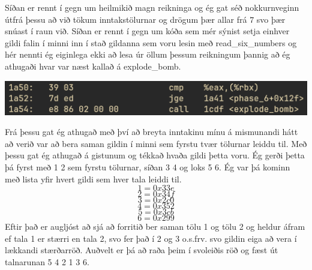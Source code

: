 \documentclass{article}
\begin{document}
	Síðan er rennt í gegn um heilmikið magn reikninga og ég gat séð 
	nokkurnveginn útfrá þessu að við tökum inntakstölurnar og drögum þær 
	allar frá $7$ svo þær snúast í raun við. Síðan er rennt í gegn um kóða sem mér sýnist 
	setja einhver gildi falin í minni inn í stað gildanna sem voru lesin með 
	read\_six\_numbers og hér nennti ég eiginlega ekki að lesa úr öllum þessum 
	reikningum þannig að ég athugaði hvar var næst kallað á explode\_bomb. 
	\begin{center}
		\includegraphics[scale=0.35]{cmp.png}
	\end{center}
	Frá þessu gat ég athugað með því að breyta inntakinu mínu á mismunandi hátt 
	að verið var að bera saman gildin í minni sem fyrstu tvær tölurnar leiddu til. 
	Með þessu gat ég athugað á gistunum og tékkað hvaða gildi þetta voru. Ég gerði 
	þetta þá fyrst með 1 2 sem fyrstu tölurnar, síðan 3 4 og loks 5 6. Ég var þá 
	kominn með lista yfir hvert gildi sem hver tala leiddi til.
	\[1 = 0x33e\]
	\[2 = 0x34f\]
	\[3 = 0x2c0\]
	\[4 = 0x352\]
	\[5 = 0x3cb\]
	\[6 = 0x299\]
	Eftir það er augljóst að sjá að forritið ber saman tölu 1 og tölu 2 og heldur 
	áfram ef tala 1 er stærri en tala 2, svo fer það í 2 og 3 o.s.frv. svo gildin 
	eiga að vera í lækkandi stærðarröð. Auðvelt er þá að raða þeim í svoleiðis röð 
	og fæst út talnarunan 5 4 2 1 3 6.
\end{document}
